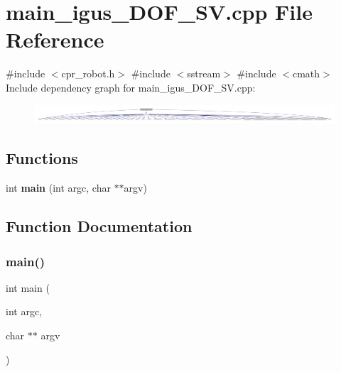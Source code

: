 \section{main\+\_\+igus\+\_\+D\+O\+F\+\_\+\+S\+V.\+cpp File Reference}
\label{main__igus__5DOF__SV_8cpp}
{\ttfamily \#include $<$cpr\+\_\+robot.\+h$>$}\newline
{\ttfamily \#include $<$sstream$>$}\newline
{\ttfamily \#include $<$cmath$>$}\newline
Include dependency graph for main\+\_\+igus\+\_\+D\+O\+F\+\_\+\+S\+V.\+cpp\+:
\nopagebreak
\begin{figure}[H]
\begin{center}
\leavevmode
\includegraphics[width=350pt]{main__igus__5DOF__SV_8cpp__incl}
\end{center}
\end{figure}
\subsection*{Functions}
\begin{DoxyCompactItemize}
\item 
int \textbf{ main} (int argc, char $\ast$$\ast$argv)
\end{DoxyCompactItemize}


\subsection{Function Documentation}
\mbox{\label{main__igus__5DOF__SV_8cpp_a3c04138a5bfe5d72780bb7e82a18e627}} 
\subsubsection{main()}
{\footnotesize\ttfamily int main (\begin{DoxyParamCaption}\item[{int}]{argc,  }\item[{char $\ast$$\ast$}]{argv }\end{DoxyParamCaption})}

